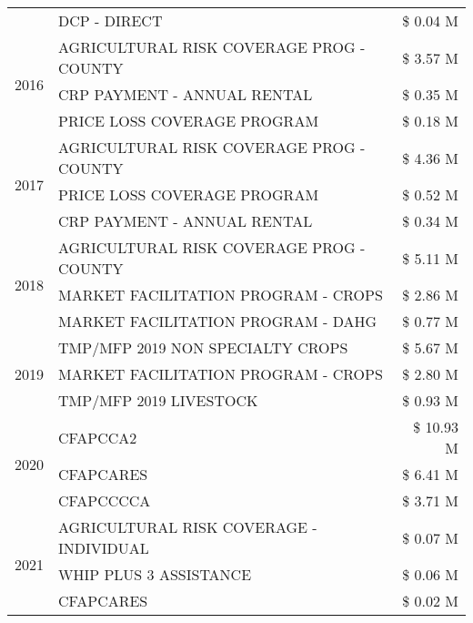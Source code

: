 \begin{tabular}{llr}
 & DCP - DIRECT & \$ 0.04 M \\
\cline{1-3}
\multirow[t]{3}{*}{2016} & AGRICULTURAL RISK COVERAGE PROG - COUNTY & \$ 3.57 M \\
 & CRP PAYMENT - ANNUAL RENTAL & \$ 0.35 M \\
 & PRICE LOSS COVERAGE PROGRAM & \$ 0.18 M \\
\cline{1-3}
\multirow[t]{3}{*}{2017} & AGRICULTURAL RISK COVERAGE PROG - COUNTY & \$ 4.36 M \\
 & PRICE LOSS COVERAGE PROGRAM & \$ 0.52 M \\
 & CRP PAYMENT - ANNUAL RENTAL & \$ 0.34 M \\
\cline{1-3}
\multirow[t]{3}{*}{2018} & AGRICULTURAL RISK COVERAGE PROG - COUNTY & \$ 5.11 M \\
 & MARKET FACILITATION PROGRAM - CROPS & \$ 2.86 M \\
 & MARKET FACILITATION PROGRAM - DAHG & \$ 0.77 M \\
\cline{1-3}
\multirow[t]{3}{*}{2019} & TMP/MFP 2019 NON SPECIALTY CROPS & \$ 5.67 M \\
 & MARKET FACILITATION PROGRAM - CROPS & \$ 2.80 M \\
 & TMP/MFP 2019 LIVESTOCK & \$ 0.93 M \\
\cline{1-3}
\multirow[t]{3}{*}{2020} & CFAPCCA2 & \$ 10.93 M \\
 & CFAPCARES & \$ 6.41 M \\
 & CFAPCCCCA & \$ 3.71 M \\
\cline{1-3}
\multirow[t]{3}{*}{2021} & AGRICULTURAL RISK COVERAGE - INDIVIDUAL & \$ 0.07 M \\
 & WHIP PLUS 3 ASSISTANCE & \$ 0.06 M \\
 & CFAPCARES & \$ 0.02 M \\
\cline{1-3}
\bottomrule
\end{tabular}

